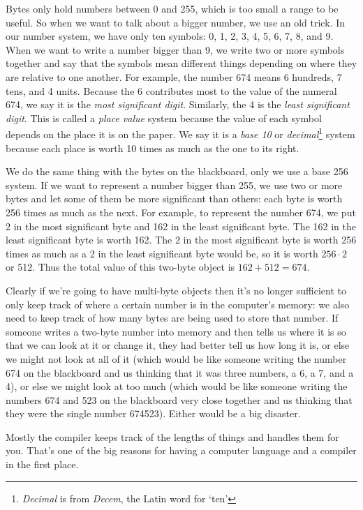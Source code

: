     Bytes only hold numbers between 0 and 255, which is too small a
range to be useful.  So when we want to talk about a bigger number, we
use an old trick.  In our number system, we have only ten symbols: 0, 1,
2, 3, 4, 5, 6, 7, 8, and 9.  When we want to write a number bigger than
9, we write two or more symbols together and say that the symbols mean
different things depending on where they are relative to one another.
For example, the number 674 means 6 hundreds, 7 tens, and 4 units.
Because the 6 contributes most to the value of the numeral 674, we say
it is the {\em most significant digit}\/.  Similarly, the 4 is the {\em
least significant digit}\/.  This is called a {\em place value} system
because the value of each symbol depends on the place it is on the
paper.  We say it is a {\em base 10} or {\em decimal}\footnote{{\em
Decimal}\/ is from {\em Decem}\/, the Latin word for `ten'} system
because each place is worth 10 times as much as the one to its right.

    We do the same thing with the bytes on the blackboard, only we use a
base 256 system.  If we want to represent a number bigger than 255, we
use two or more bytes and let some of them be more significant than
others: each byte is worth 256 times as much as the next.  For example,
to represent the number 674, we put 2 in the most significant byte and
162 in the least significant byte.  The 162 in the least significant
byte is worth 162.  The 2 in the most significant byte is worth 256
times as much as a 2 in the least significant byte would be, so it is
worth $256\cdot 2$ or 512.  Thus the total value of this two-byte object
is $162+512 = 674$.

    Clearly if we're going to have multi-byte objects then it's no
longer sufficient to only keep track of where a certain number is in the
computer's memory: we also need to keep track of how many bytes are
being used to store that number.  If someone writes a two-byte number
into memory and then tells us where it is so that we can look at it or
change it, they had better tell us how long it is, or else we might not
look at all of it (which would be like someone writing the number 674 on
the blackboard and us thinking that it was three numbers, a 6, a 7, and
a 4), or else we might look at too much (which would be like someone
writing the numbers 674 and 523 on the blackboard very close together
and us thinking that they were the single number 674523).  Either would
be a big disaster.

    Mostly the compiler keeps track of the lengths of things and handles
them for you.  That's one of the big reasons for having a computer
language and a compiler in the first place.

